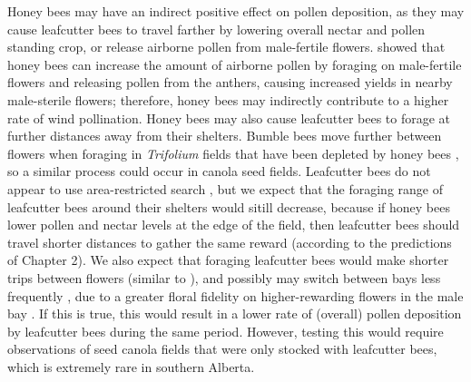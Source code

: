 \documentclass[12pt, draft]{article} %
\begin{document}

Honey bees may have an indirect positive effect on pollen deposition, as they may cause leafcutter bees to travel farther by lowering overall nectar and pollen standing crop, or release airborne pollen from male-fertile flowers.
\citet{pierre2010} showed that honey bees can increase the amount of airborne pollen by foraging on male-fertile flowers and releasing pollen from the anthers, causing increased yields in nearby male-sterile flowers; therefore, honey bees may indirectly contribute to a higher rate of wind pollination.
Honey bees may also cause leafcutter bees to forage at further distances away from their shelters.
Bumble bees move further between flowers when foraging in \textit{Trifolium} fields that have been depleted by honey bees \citet{heinrich1979}, so a similar process could occur in canola seed fields. 
Leafcutter bees do not appear to use area-restricted search \citep{brunet2019}, but we expect that the foraging range of leafcutter bees around their shelters would sitill decrease, because if honey bees lower pollen and nectar levels at the edge of the field, then leafcutter bees should travel shorter distances to gather the same reward (according to the predictions of Chapter 2).
We also expect that foraging leafcutter bees would make shorter trips between flowers (similar to \citealp{heinrich1979}), and possibly may switch between bays less frequently \citep{waytesMsc,gaffney2019}, due to a greater floral fidelity on higher-rewarding flowers in the male bay \citep{mesquida1978}.
If this is true, this would result in a lower rate of (overall) pollen deposition by leafcutter bees during the same period.
However, testing this would require observations of seed canola fields that were only stocked with leafcutter bees, which is extremely rare in southern Alberta.
\end{document}
